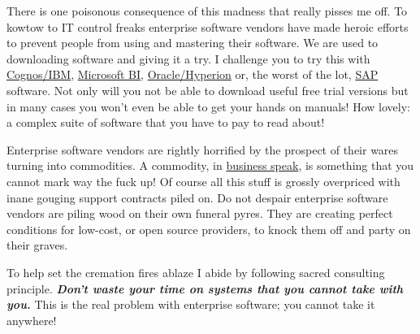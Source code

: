 There is one poisonous consequence of this madness that really pisses me
off. To kowtow to IT control freaks enterprise software vendors have
made heroic efforts to prevent people from using and mastering their
software. We are used to downloading software and giving it a try. I
challenge you to try this with
\href{http://www-01.ibm.com/software/data/cognos/}{Cognos/IBM},
\href{http://www.microsoft.com/bi/}{Microsoft BI},
\href{http://www.oracle.com/hyperion/index.html}{Oracle/Hyperion} or,
the worst of the lot, \href{http://www.sap.com/index.epx}{SAP} software.
Not only will you not be able to download useful free trial versions but
in many cases you won't even be able to get your hands on manuals! How
lovely: a complex suite of software that you have to pay to read about!

Enterprise software vendors are rightly horrified by the prospect of
their wares turning into commodities. A commodity, in
\href{http://en.wikipedia.org/wiki/Business\_speak}{business speak}, is
something that you cannot mark way the fuck up! Of course all this stuff
is grossly overpriced with inane gouging support contracts piled on. Do
not despair enterprise software vendors are piling wood on their own
funeral pyres. They are creating perfect conditions for low-cost, or
open source providers, to knock them off and party on their graves.

To help set the cremation fires ablaze I abide by following sacred
consulting principle. \emph{\textbf{Don't waste your time on systems
that you cannot take with you.}} This is the real problem with
enterprise software; you cannot take it anywhere!




%